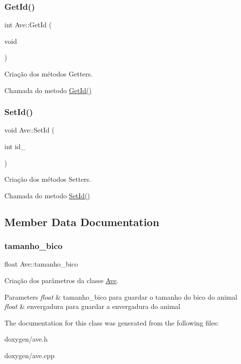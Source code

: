 \subsubsection{\texorpdfstring{Get\+Id()}{GetId()}}
{\footnotesize\ttfamily int Ave\+::\+Get\+Id (\begin{DoxyParamCaption}\item[{void}]{ }\end{DoxyParamCaption})}



Criação dos métodos Getters. 

Chamada do metodo \mbox{\hyperlink{class_ave_a5c3d1e3b7b356a08b2fddd242c2fa426}{Get\+Id()}} \mbox{\label{class_ave_add888c033de541a44c5c31a31db5ad1d}} 
\subsubsection{\texorpdfstring{Set\+Id()}{SetId()}}
{\footnotesize\ttfamily void Ave\+::\+Set\+Id (\begin{DoxyParamCaption}\item[{int}]{id\+\_\+ }\end{DoxyParamCaption})}



Criação dos métodos Setters. 

Chamada do metodo \mbox{\hyperlink{class_ave_add888c033de541a44c5c31a31db5ad1d}{Set\+Id()}} 

\subsection{Member Data Documentation}
\mbox{\label{class_ave_a0285e182b8a55a290b10b621ed93602d}} 
\subsubsection{\texorpdfstring{tamanho\+\_\+bico}{tamanho\_bico}}
{\footnotesize\ttfamily float Ave\+::tamanho\+\_\+bico}



Criação dos parâmetros da classe \mbox{\hyperlink{class_ave}{Ave}}. 


\begin{DoxyParams}{Parameters}
{\em float} & tamanho\+\_\+bico para guardar o tamanho do bico do animal \\
\hline
{\em float} & envergadura para guardar a envergadura do animal \\
\hline
\end{DoxyParams}


The documentation for this class was generated from the following files\+:\begin{DoxyCompactItemize}
\item 
doxygen/ave.\+h\item 
doxygen/ave.\+cpp\end{DoxyCompactItemize}
